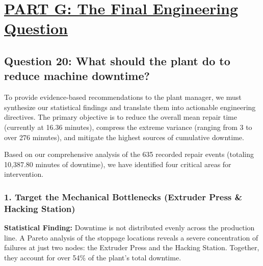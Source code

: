 \section*{\underline{PART G: The Final Engineering Question}}

\subsection*{Question 20: What should the plant do to reduce machine downtime?}

To provide evidence-based recommendations to the plant manager, we must synthesize our statistical findings and translate them into actionable engineering directives. The primary objective is to reduce the overall mean repair time (currently at 16.36 minutes), compress the extreme variance (ranging from 3 to over 276 minutes), and mitigate the highest sources of cumulative downtime.

Based on our comprehensive analysis of the 635 recorded repair events (totaling 10,387.80 minutes of downtime), we have identified four critical areas for intervention.

\subsubsection*{1. Target the Mechanical Bottlenecks (Extruder Press \& Hacking Station)}

\textbf{Statistical Finding:} 
Downtime is not distributed evenly across the production line. A Pareto analysis of the stoppage locations reveals a severe concentration of failures at just two nodes: the Extruder Press and the Hacking Station. Together, they account for over 54\% of the plant's total downtime.

\begin{table}[H]
    \centering
    \caption{Top 5 Locations by Total Downtime Contribution}
    \label{tab:top_locations}
\end{table}

